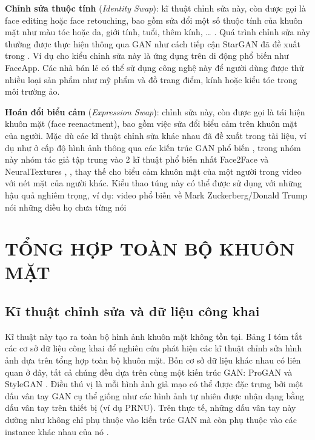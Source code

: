\documentclass{article}
\begin{document}
\textbf{Chỉnh sửa thuộc tính} (\textit{Identity Swap}): kĩ thuật chỉnh sửa này, còn được gọi là face editing hoặc face retouching, bao gồm sửa đổi một số thuộc tính của khuôn mặt như màu tóc hoặc da, giới tính, tuổi, thêm kính, … . Quá trình chỉnh sửa này thường được thực hiện thông qua GAN như cách tiếp cận StarGAN đã đề xuất trong . Ví dụ cho kiểu chỉnh sửa này là ứng dụng trên di động phổ biến như FaceApp. Các nhà bán lẻ có thể sử dụng công nghệ này để người dùng được thử nhiều loại sản phẩm như mỹ phẩm và đồ trang điểm, kính hoặc kiểu tóc trong môi trường ảo.

\textbf{Hoán đổi biểu cảm} (\textit{Expression Swap}): chỉnh sửa này, còn được gọi là tái hiện khuôn mặt (face reenactment), bao gồm việc sửa đổi biểu cảm trên khuôn mặt của người. Mặc dù các kĩ thuật chỉnh sửa khác nhau đã đề xuất trong tài liệu, ví dụ như ở cấp độ hình ảnh thông qua các kiến trúc GAN phổ biến , trong nhóm này nhóm tác giả tập trung vào 2 kĩ thuật phổ biến nhất Face2Face và NeuralTextures , , thay thế cho biểu cảm khuôn mặt của một người trong video với nét mặt của người khác. Kiểu thao túng này có thể được sử dụng với những hậu quả nghiêm trọng, ví dụ: video phổ biến về Mark Zuckerberg/Donald Trump nói những điều họ chưa từng nói

\section{TỔNG HỢP TOÀN BỘ KHUÔN MẶT} \label{sec:3-entire-face}

\subsection{Kĩ thuật chỉnh sửa và dữ liệu công khai} \label{sec:3-a-technique}

Kĩ thuật này tạo ra toàn bộ hình ảnh khuôn mặt không tồn tại. Bảng I tóm tắt các cơ sở dữ liệu công khai để nghiên cứu phát hiện các kĩ thuật chỉnh sửa hình ảnh dựa trên tổng hợp toàn bộ khuôn mặt. Bốn cơ sở dữ liệu khác nhau có liên quan ở đây, tất cả chúng đều dựa trên cùng một kiến trúc GAN: ProGAN  và StyleGAN . Điều thú vị là mỗi hình ảnh giả mạo có thể được đặc trưng bởi một dấu vân tay GAN cụ thể giống như các hình ảnh tự nhiên được nhận dạng bằng dấu vân tay trên thiết bị (ví dụ PRNU). Trên thực tế, những dấu vân tay này dường như không chỉ phụ thuộc vào kiến trúc GAN mà còn phụ thuộc vào các instance khác nhau của nó   .
\end{document}
